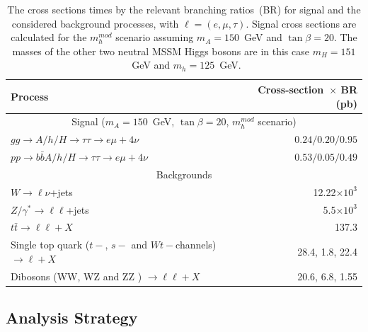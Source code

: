 \begin{table}[!tp]
\begin{center}
\caption{The cross sections times by the relevant branching ratios~(BR) for signal and the considered
background processes, with $\ell= (e, \mu, \tau)$. 
Signal cross sections are calculated for the $m_{h}^{mod}$ scenario assuming
 $m_A=150$~GeV and $\tan\beta=20$. The masses of the other two neutral MSSM Higgs bosons are 
	in this case  $m_H=151$~GeV and $m_h=125$~GeV.} 
\vspace{2mm}
\begin{small}
\begin{tabular}{lr}
\hline \hline
Process                                                                 & Cross-section~$\times$ BR (pb) \\ [1pt]
\hline
\multicolumn{2}{c}{Signal ($m_A=150$~GeV, $\tan\beta=20$, $m_{h}^{mod}$ scenario) }  \\ [1pt]

$gg\rightarrow A/h/H \rightarrow\tau\tau \rightarrow e\mu+ 4\nu$                 &  $0.24 /0.20 / 0.95 $ \\
$pp \rightarrow b\bar{b}A/h/H \rightarrow \tau\tau \rightarrow e\mu + 4\nu$       & $0.53 /0.05 / 0.49   $ \\[1pt]
\hline
\multicolumn{2}{c}{Backgrounds} \\[1pt]
$W\rightarrow \ell \nu$+jets                           & 12.22$\times 10^3$ \\
$Z/\gamma^{*}\rightarrow \ell\ell$+jets       & 5.5$\times 10^3$ \\
$t\bar{t} \rightarrow \ell \ell + X$                                                              & 137.3 \\
Single top quark ($t-$, $s-$ and $Wt-$channels) $\rightarrow \ell + X$               & 28.4, 1.8, 22.4 \\
Dibosons (WW, WZ and ZZ ) $\rightarrow \ell \ell+ X$                                          & 20.6, 6.8, 1.55 \\ [1pt]
\hline 
\hline
\end{tabular}
\end{small}
 \label{tab:MCxsec}

\end{center}
\end{table}


\subsection{Analysis Strategy} \label{sec:strategy}


